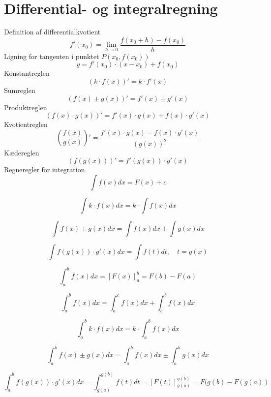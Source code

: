 \section{Differential- og integralregning}
Definition af differentialkvotient
$$f'(x_0)=\lim_{h \to 0}\frac{f(x_0+h)-f(x_0)}{h} $$
Ligning for tangenten i punktet $P(x_0,f(x_0))$
$$y=f'(x_0)\cdot(x-x_0)+f(x_0)$$
Konstantreglen
$$(k\cdot f(x))'=k\cdot f'(x)$$
Sumreglen
$$(f(x)\pm g(x))'=f'(x)\pm g'(x)$$
Produktreglen
$$(f(x)\cdot g(x))'=f'(x)\cdot g(x)+f(x)\cdot g'(x)$$
Kvotientreglen
$$\left ( \frac{f(x)}{g(x)}\right )'=\frac{f'(x)\cdot g(x)-f(x)\cdot g'(x)}{(g(x))^2}$$
Kædereglen
$$(f(g(x)))'=f'(g(x))\cdot g'(x)$$
Regneregler for integration
$$\int f(x)dx=F(x)+c$$

$$\int k\cdot f( x)dx=k\cdot \int f(x)dx$$

$$\int f (x)\pm g( x)dx=\int  f(x)dx\pm \int g( x)dx$$

$$\int f(g (x))\cdot g'(x)dx=\int f(t)dt, \quad t=g(x)$$

$$\int_a ^b f(x)dx=[F(x)]_a ^b=F(b)-F(a)$$

$$\int_a ^b f(x)dx=\int_a ^c f(x)dx+\int_c ^b f(x)dx$$

$$\int_a^b k\cdot f( x)dx=k\cdot \int^b_a f(x)dx$$

$$\int^b_a f (x)\pm g( x)dx=\int^{b}_{a}  f(x)dx\pm \int_a^b g( x)dx$$

$$\int^b_a f(g (x))\cdot g'(x)dx=\int^{g(b)}_{g(a)} f(t)dt=[F(t)]^{g(b)}_{g(a)}=F(g(b)-F(g(a))$$
